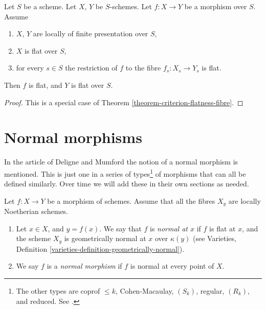 \begin{lemma}
\label{lemma-morphism-between-flat}
Let $S$ be a scheme.
Let $X$, $Y$ be $S$-schemes.
Let $f : X \to Y$ be a morphism over $S$.
Assume
\begin{enumerate}
\item $X$, $Y$ are locally of finite presentation over $S$,
\item $X$ is flat over $S$,
\item for every $s \in S$ the restriction of $f$ to the
fibre $f_s : X_s \to Y_s$ is flat.
\end{enumerate}
Then $f$ is flat, and $Y$ is flat over $S$.
\end{lemma}

\begin{proof}
This is a special case of
Theorem \ref{theorem-criterion-flatness-fibre}.
\end{proof}












\section{Normal morphisms}
\label{section-normal}

\noindent
In the article \cite{DM} of Deligne and Mumford the notion of a normal
morphism is mentioned. This is just one in a series of types\footnote{
The other types are coprof $\leq k$, Cohen-Macaulay, $(S_k)$,
regular, $(R_k)$, and reduced. See \cite[IV Definition 6.8.1.]{EGA}.}
of morphisms that can all be defined similarly. Over time we will add
these in their own sections as needed.

\begin{definition}
\label{definition-normal}
Let $f : X \to Y$ be a morphism of schemes.
Assume that all the fibres $X_y$ are locally Noetherian schemes.
\begin{enumerate}
\item Let $x \in X$, and $y = f(x)$. We say that $f$ is {\it normal at $x$}
if $f$ is flat at $x$, and the scheme $X_y$ is geometrically
normal at $x$ over $\kappa(y)$ (see
Varieties, Definition \ref{varieties-definition-geometrically-normal}).
\item We say $f$ is a {\it normal morphism} if $f$ is normal
at every point of $X$.
\end{enumerate}
\end{definition}

